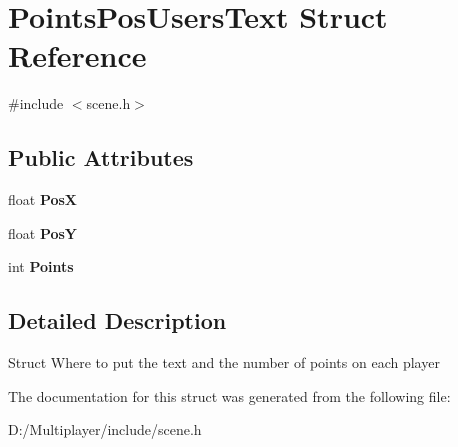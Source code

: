 \hypertarget{struct_points_pos_users_text}{}\section{Points\+Pos\+Users\+Text Struct Reference}
\label{struct_points_pos_users_text}


{\ttfamily \#include $<$scene.\+h$>$}

\subsection*{Public Attributes}
\begin{DoxyCompactItemize}
\item 
\mbox{\label{struct_points_pos_users_text_a82324a71c73e0ee06d86db7457cb20c6}} 
float {\bfseries PosX}
\item 
\mbox{\label{struct_points_pos_users_text_a36c942a28e9e04ffb94a96bc0233dcbb}} 
float {\bfseries PosY}
\item 
\mbox{\label{struct_points_pos_users_text_ae5df179503ec3f1b37eaa1e561fec5e1}} 
int {\bfseries Points}
\end{DoxyCompactItemize}


\subsection{Detailed Description}
Struct Where to put the text and the number of points on each player 

The documentation for this struct was generated from the following file\+:\begin{DoxyCompactItemize}
\item 
D\+:/\+Multiplayer/include/scene.\+h\end{DoxyCompactItemize}
